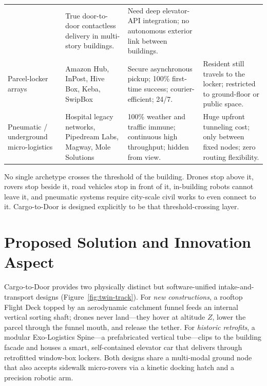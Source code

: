 \documentclass[11pt,a4paper]{report}
\begin{document}
\begin{table}[H]
\begin{tabularx}{\linewidth}{L{3.0cm} L{3.4cm} X X}
    & True door-to-door contactless delivery in multi-story buildings.
    & Need deep elevator-API integration; no autonomous exterior link between buildings. \\
\addlinespace
Parcel-locker arrays
    & Amazon Hub, InPost, Hive Box, Keba, SwipBox
    & Secure asynchronous pickup; 100\% first-time success; courier-efficient; 24/7.
    & Resident still travels to the locker; restricted to ground-floor or public space. \\
\addlinespace
Pneumatic / underground micro-logistics
    & Hospital legacy networks, Pipedream Labs, Magway, Mole Solutions
    & 100\% weather and traffic immune; continuous high throughput; hidden from view.
    & Huge upfront tunneling cost; only between fixed nodes; zero routing flexibility. \\
\bottomrule
\end{tabularx}
\end{table}

No single archetype crosses the threshold of the building. Drones stop
above it, rovers stop beside it, road vehicles stop in front of it,
in-building robots cannot leave it, and pneumatic systems require
city-scale civil works to even connect to it. Cargo-to-Door is designed
explicitly to be that threshold-crossing layer.

\section{Proposed Solution and Innovation Aspect}
\label{sec:proposed}

Cargo-to-Door provides two physically distinct but software-unified
intake-and-transport designs (Figure~\ref{fig:twin-track}). For
\emph{new constructions}, a rooftop Flight Deck topped by an
aerodynamic catchment funnel feeds an internal vertical sorting shaft;
drones never land---they hover at altitude $Z$, lower the parcel through
the funnel mouth, and release the tether. For \emph{historic
retrofits}, a modular Exo-Logistics Spine---a prefabricated vertical
tube---clips to the building facade and houses a smart, self-contained
elevator car that delivers through retrofitted window-box lockers.
Both designs share a multi-modal ground node that also accepts
sidewalk micro-rovers via a kinetic docking hatch and a precision
robotic arm.
\end{document}
